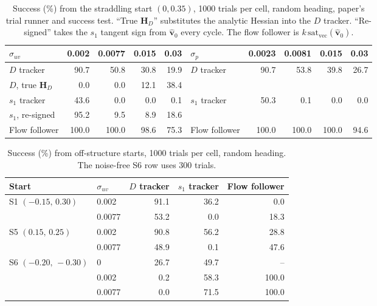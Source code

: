 \documentclass[10.5pt]{article}
\newcommand{\satv}{\mathrm{sat}_{\mathrm{vec}}}
\begin{document}
\begin{table}[h]
\centering\small
\caption{Success (\%) from the straddling start $(0,0.35)$, 1000 trials per cell, random heading, paper's trial runner and success test. ``True $\mathbf H_D$'' substitutes the analytic Hessian into the $D$ tracker. ``Re-signed'' takes the $s_1$ tangent sign from $\hat{\mathbf v}_0$ every cycle. The flow follower is $k\,\satv(\hat{\mathbf v}_0)$.}
\label{tab:noise}
\begin{tabular}{@{}lrrrr@{\qquad}lrrrr@{}}
\toprule
$\sigma_{uv}$ & 0.002 & 0.0077 & 0.015 & 0.03 & $\sigma_p$ & 0.0023 & 0.0081 & 0.015 & 0.03\\
\midrule
$D$ tracker & 90.7 & 50.8 & 30.8 & 19.9 & $D$ tracker & 90.7 & 53.8 & 39.8 & 26.7\\
$D$, true $\mathbf H_D$ & 0.0 & 0.0 & 12.1 & 38.4 & & & & &\\
$s_1$ tracker & 43.6 & 0.0 & 0.0 & 0.1 & $s_1$ tracker & 50.3 & 0.1 & 0.0 & 0.0\\
$s_1$, re-signed & 95.2 & 9.5 & 8.9 & 18.6 & & & & &\\
Flow follower & 100.0 & 100.0 & 98.6 & 75.3 & Flow follower & 100.0 & 100.0 & 100.0 & 94.6\\
\bottomrule
\end{tabular}
\end{table}

\begin{table}[h]
\centering\small
\caption{Success (\%) from off-structure starts, 1000 trials per cell, random heading. The noise-free S6 row uses 300 trials.}
\label{tab:offstart}
\begin{tabular}{@{}llrrr@{}}
\toprule
Start & $\sigma_{uv}$ & $D$ tracker & $s_1$ tracker & Flow follower\\
\midrule
S1 $(-0.15,\,0.30)$ & 0.002 & 91.1 & 36.2 & 0.0\\
 & 0.0077 & 53.2 & 0.0 & 18.3\\
S5 $(0.15,\,0.25)$ & 0.002 & 90.8 & 56.2 & 28.8\\
 & 0.0077 & 48.9 & 0.1 & 47.6\\
S6 $(-0.20,\,-0.30)$ & 0 & 26.7 & 49.7 & --\\
 & 0.002 & 0.2 & 58.3 & 100.0\\
 & 0.0077 & 0.0 & 71.5 & 100.0\\
\bottomrule
\end{tabular}
\end{table}
\end{document}
